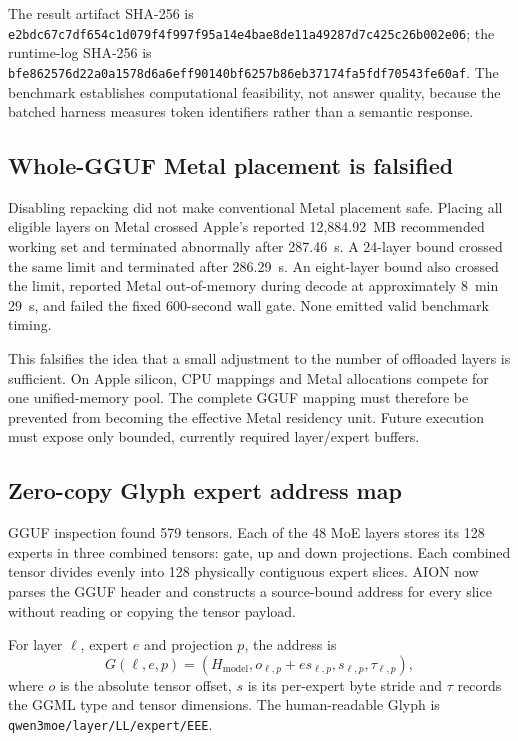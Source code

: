 The result artifact SHA-256 is
\texttt{e2bdc67c7df654c1d079f4f997f95a14e4bae8de11a49287d7c425c26b002e06};
the runtime-log SHA-256 is
\texttt{bfe862576d22a0a1578d6a6eff90140bf6257b86eb37174fa5fdf70543fe60af}.
The benchmark establishes computational feasibility, not answer quality, because
the batched harness measures token identifiers rather than a semantic response.

\subsection{Whole-GGUF Metal placement is falsified}

Disabling repacking did not make conventional Metal placement safe.  Placing all
eligible layers on Metal crossed Apple's reported 12{,}884.92~MB recommended
working set and terminated abnormally after 287.46~s.  A 24-layer bound crossed
the same limit and terminated after 286.29~s.  An eight-layer bound also crossed
the limit, reported Metal out-of-memory during decode at approximately 8~min
29~s, and failed the fixed 600-second wall gate.  None emitted valid benchmark
timing.

This falsifies the idea that a small adjustment to the number of offloaded layers
is sufficient.  On Apple silicon, CPU mappings and Metal allocations compete for
one unified-memory pool.  The complete GGUF mapping must therefore be prevented
from becoming the effective Metal residency unit.  Future execution must expose
only bounded, currently required layer/expert buffers.

\subsection{Zero-copy Glyph expert address map}

GGUF inspection found 579 tensors.  Each of the 48 MoE layers stores its 128
experts in three combined tensors: gate, up and down projections.  Each combined
tensor divides evenly into 128 physically contiguous expert slices.  AION now
parses the GGUF header and constructs a source-bound address for every slice
without reading or copying the tensor payload.

For layer $\ell$, expert $e$ and projection $p$, the address is
\begin{equation}
  G(\ell,e,p) = (H_{\mathrm{model}}, o_{\ell,p} + e s_{\ell,p},
                 s_{\ell,p}, \tau_{\ell,p}),
\end{equation}
where $o$ is the absolute tensor offset, $s$ is its per-expert byte stride and
$\tau$ records the GGML type and tensor dimensions.  The human-readable Glyph is
\texttt{qwen3moe/layer/LL/expert/EEE}.

